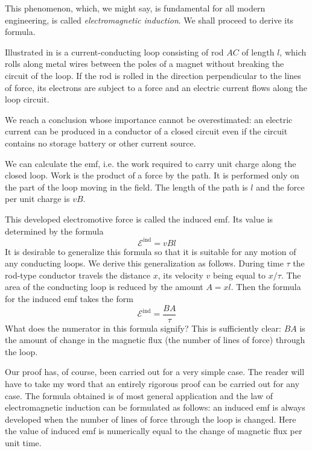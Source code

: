 This phenomenon, which, we might say, is fundamental for all modern engineering, is called \emph{electromagnetic induction}. We shall proceed to derive its formula.

Illustrated in  is a current-conducting loop consisting of rod $AC$ of length $l$, which rolls along metal wires between the poles of a magnet without breaking the circuit of the loop. If the rod is rolled in the direction perpendicular to the lines of force, its electrons are subject to a force and an electric current flows along the loop circuit.

We reach a conclusion whose importance cannot be overestimated: an electric current can be produced in a conductor of a closed circuit even if the circuit contains no storage battery or other current source.

We can calculate the emf, i.e. the work required to carry unit charge along the closed loop. Work is the product of a force by the path. It is performed only on the part of the loop moving in the field. The length of the path is $l$ and the force per unit charge is $vB$.

This developed electromotive force is called the induced emf. Its value is determined by the formula
\begin{equation*}%
\mathcal{E}^{\textrm{ind}} = vBl
\end{equation*}
It is desirable to generalize this formula so that it is suitable for any motion of any conducting loops. We derive this generalization as follows. During time $\tau$ the rod-type conductor travels the distance $x$, its velocity $v$ being equal to $x/\tau$. The area of the conducting loop is reduced by the amount $A = xl$. Then the formula for the induced emf takes the form
\begin{equation*}%
\mathcal{E}^{\textrm{ind}} = \frac{BA}{\tau}
\end{equation*}
What does the numerator in this formula signify? This is sufficiently clear: $BA$ is the amount of change in the magnetic flux (the number of lines of force) through the loop.

Our proof has, of course, been carried out for a very simple case. The reader will have to take my word that an entirely rigorous proof can be carried out for any case. The formula obtained is of most general application and the law of electromagnetic induction can be formulated as follows: an induced emf is always developed when the number of lines of force through the loop is changed. Here the value of induced emf is numerically equal to the change of magnetic flux per unit time.

